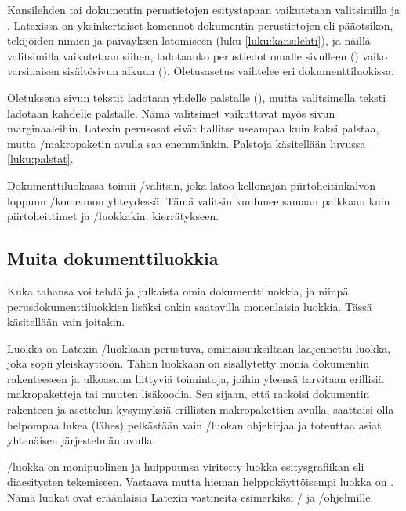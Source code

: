 Kansilehden tai dokumentin perustietojen esitystapaan vaikutetaan
valitsimilla   ja
.  Latexissa on
yksinkertaiset komennot dokumentin perustietojen eli pääotsikon,
tekijöiden nimien ja päiväyksen latomiseen (luku \ref{luku:kansilehti}),
ja näillä valitsimilla vaikutetaan siihen, ladotaanko perustiedot omalle
sivulleen () vaiko varsinaisen sisältösivun alkuun
(). Oletus\-asetus vaihtelee eri
dokumenttiluokissa.

Oletuksena sivun tekstit ladotaan yhdelle palstalle
(),  mutta valitsimella
  teksti ladotaan kahdelle
palstalle. Nämä valitsimet vaikuttavat myös sivun marginaaleihin.
Latexin perusosat eivät hallitse useampaa kuin kaksi palstaa, mutta
\-/makropaketin avulla saa enemmänkin. Palstoja
käsitellään luvussa \ref{luku:palstat}.

Dokumenttiluokassa  toimii \-/valitsin,
 joka latoo kellon\-ajan piirtoheitinkalvon loppuun
\-/komennon yhteydessä. Tämä valitsin kuulunee samaan
paikkaan kuin piirtoheittimet ja \-/luokkakin:
kierrätykseen.

\subsection{Muita dokumenttiluokkia}

Kuka tahansa voi tehdä ja julkaista omia dokumenttiluokkia, ja niinpä
perusdokumenttiluokkien lisäksi onkin saatavilla monenlaisia luokkia.
Tässä käsitellään vain joitakin.

Luokka  on Latexin \-/luokkaan perustuva,
ominaisuuksiltaan laajennettu luokka, joka sopii yleiskäyttöön. Tähän
luokkaan on sisällytetty monia dokumentin rakenteeseen ja ulkoasuun
liittyviä toimintoja, joihin yleensä tarvitaan erillisiä makropaketteja
tai muuten lisäkoodia. Sen sijaan, että ratkoisi dokumentin rakenteen ja
asettelun kysymyksiä erillisten makropakettien avulla, saattaisi olla
helpompaa lukea (lähes) pelkästään vain \-/luokan
ohjekirjaa ja toteuttaa asiat yhtenäisen järjestelmän avulla.

\-/luokka on monipuolinen ja huippuunsa viritetty luokka
esi\-tys\-gra\-fii\-kan eli dia\-esi\-tys\-ten tekemiseen. Vastaava
mutta hieman helppokäyttöisempi luokka on . Nämä
luokat ovat eräänlaisia Latexin vastineita esimerkiksi
\-/{} ja 
\=/ohjelmille.

